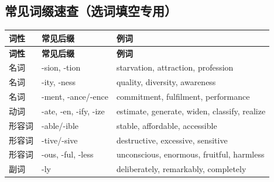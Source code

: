 \subsection{常见词缀速查（选词填空专用）}

\begin{center}
\small
\begin{longtable}{p{3.4cm}p{4.6cm}p{6.6cm}}
\toprule
\textbf{词性} & \textbf{常见后缀} & \textbf{例词} \\
\midrule
\endfirsthead
\toprule
\textbf{词性} & \textbf{常见后缀} & \textbf{例词} \\
\midrule
\endhead
名词 & -sion, -tion & starvation, attraction, profession \\
名词 & -ity, -ness & quality, diversity, awareness \\
名词 & -ment, -ance/-ence & commitment, fulfilment, performance \\
动词 & -ate, -en, -ify, -ize & estimate, generate, widen, classify, realize \\
形容词 & -able/-ible & stable, affordable, accessible \\
形容词 & -tive/-sive & destructive, excessive, sensitive \\
形容词 & -ous, -ful, -less & unconscious, enormous, fruitful, harmless \\
副词 & -ly & deliberately, remarkably, completely \\
\bottomrule
\end{longtable}
\end{center}
